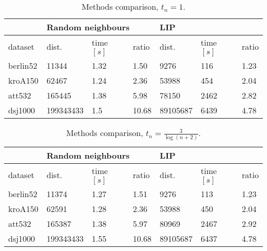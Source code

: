 \begin{table}[!htb]
	\centering
	\begin{tabular}{l|lll|lll|}
		\cline{2-7}
		& \multicolumn{3}{l|}{Random neighbours}                                        & \multicolumn{3}{l|}{LIP}                                          \\ \hline
		\multicolumn{1}{|l|}{dataset}  & \multicolumn{1}{l|}{dist.}     & \multicolumn{1}{l|}{time $[s]$} & ratio & \multicolumn{1}{l|}{dist.}    & \multicolumn{1}{l|}{time $[s]$} & ratio \\ \hline
		\multicolumn{1}{|l|}{berlin52} & \multicolumn{1}{l|}{11344}     & \multicolumn{1}{l|}{1.32} & 1.50  & \multicolumn{1}{l|}{9276}     & \multicolumn{1}{l|}{116}  & 1.23  \\ \hline
		\multicolumn{1}{|l|}{kroA150}  & \multicolumn{1}{l|}{62467}     & \multicolumn{1}{l|}{1.24} & 2.36  & \multicolumn{1}{l|}{53988}    & \multicolumn{1}{l|}{454}  & 2.04  \\ \hline
		\multicolumn{1}{|l|}{att532}   & \multicolumn{1}{l|}{165445}    & \multicolumn{1}{l|}{1.38} & 5.98  & \multicolumn{1}{l|}{78150}    & \multicolumn{1}{l|}{2462} & 2.82  \\ \hline
		\multicolumn{1}{|l|}{dsj1000}  & \multicolumn{1}{l|}{199343433} & \multicolumn{1}{l|}{1.5}  & 10.68 & \multicolumn{1}{l|}{89105687} & \multicolumn{1}{l|}{6439} & 4.78  \\ \hline
	\end{tabular}
	\caption{Methods comparison, $t_n=1$.}
	\label{tab:results_comp_cool=1}
\end{table}

\begin{table}[!htb]
	\centering
	\begin{tabular}{l|lll|lll|}
		\cline{2-7}
		& \multicolumn{3}{l|}{Random neighbours}                                        & \multicolumn{3}{l|}{LIP}                                          \\ \hline
		\multicolumn{1}{|l|}{dataset}  & \multicolumn{1}{l|}{dist.}     & \multicolumn{1}{l|}{time $[s]$} & ratio & \multicolumn{1}{l|}{dist.}    & \multicolumn{1}{l|}{time $[s]$} & ratio \\ \hline
		\multicolumn{1}{|l|}{berlin52} & \multicolumn{1}{l|}{11374}     & \multicolumn{1}{l|}{1.27} & 1.51  & \multicolumn{1}{l|}{9276}     & \multicolumn{1}{l|}{113}  & 1.23  \\ \hline
		\multicolumn{1}{|l|}{kroA150}  & \multicolumn{1}{l|}{62591}     & \multicolumn{1}{l|}{1.28} & 2.36  & \multicolumn{1}{l|}{53988}    & \multicolumn{1}{l|}{450}  & 2.04  \\ \hline
		\multicolumn{1}{|l|}{att532}   & \multicolumn{1}{l|}{165387}    & \multicolumn{1}{l|}{1.38} & 5.97  & \multicolumn{1}{l|}{80969}    & \multicolumn{1}{l|}{2467} & 2.92  \\ \hline
		\multicolumn{1}{|l|}{dsj1000}  & \multicolumn{1}{l|}{199343433} & \multicolumn{1}{l|}{1.55} & 10.68 & \multicolumn{1}{l|}{89105687} & \multicolumn{1}{l|}{6437} & 4.78  \\ \hline
	\end{tabular}
	\caption{Methods comparison, $t_n=\frac{3}{\log(n+2)}$.}
	\label{tab:results_comp_cool=2.73}
\end{table}